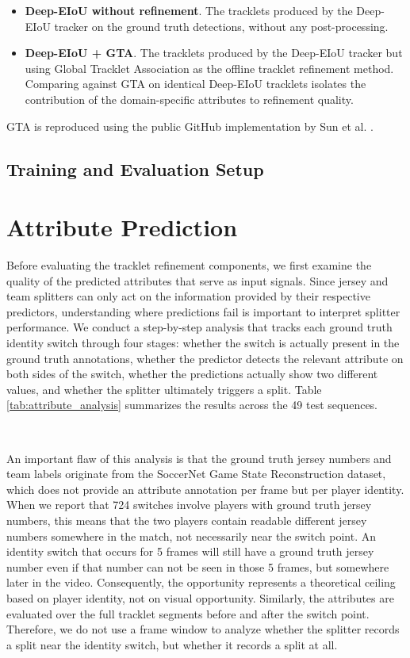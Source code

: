 \begin{itemize}
    \item \textbf{Deep-EIoU without refinement}. The tracklets produced by the Deep-EIoU tracker on the  ground truth detections, without any post-processing.

    \item \textbf{Deep-EIoU + GTA}. The tracklets  produced by the Deep-EIoU tracker but using Global Tracklet Association as the offline tracklet refinement method. Comparing against GTA on identical Deep-EIoU tracklets isolates the contribution of the domain-specific attributes to refinement quality.
\end{itemize}

GTA is reproduced using the public GitHub implementation by Sun et al. \cite{gta}. 

\subsection{Training and Evaluation Setup}\label{sec:training_and_evaluation}





\section{Attribute Prediction}
Before evaluating the tracklet refinement components, we first examine the quality of the predicted attributes that serve as input signals. Since jersey and team splitters can only act on the information provided by their respective predictors, understanding where predictions fail is important to interpret splitter performance. We conduct a step-by-step analysis that tracks each ground truth  identity switch through four stages: whether the switch is actually present in the ground truth annotations, whether the predictor detects the relevant attribute on both sides of the switch, whether the predictions actually show two different values, and whether the splitter ultimately triggers a split. Table \ref{tab:attribute_analysis} summarizes the results across the 49 test sequences.

\

An important flaw of this  analysis is that the ground truth jersey numbers and team labels originate from the SoccerNet Game State Reconstruction dataset, which does not provide an attribute annotation per frame but per player identity. When we report that 724 switches involve players with ground truth jersey numbers, this means that the two players contain readable different jersey numbers somewhere in the match, not necessarily near the switch point. An identity switch that occurs for 5 frames will still have a ground truth jersey number even if that number can not be seen in those 5 frames, but somewhere later in the video. Consequently, the opportunity represents a theoretical ceiling based on player identity, not on visual opportunity. Similarly, the attributes are evaluated over the full tracklet segments before and after the switch point. Therefore, we do not use a frame window to analyze whether the splitter records a split near the identity switch, but whether it records a split at all.


